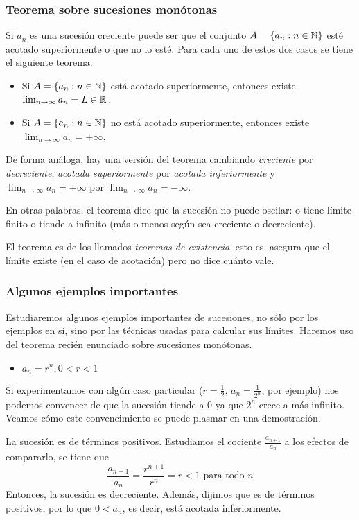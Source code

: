 \documentclass[../teoria.root.tex]{subfiles}
\begin{document}
\subsubsection{Teorema sobre sucesiones monótonas}
Si \(a_n\) es una sucesión creciente puede ser que el conjunto \(A=\{a_n:n\in\mathbb{N}\}\) esté acotado superiormente o que no lo esté.
Para cada uno de estos dos casos se tiene el siguiente teorema.
\begin{itemize}
	\item Si \(A=\{a_n:n\in\mathbb{N}\}\) está acotado superiormente, entonces existe \(\lim_{n\to\infty}a_n=L\in\mathbb{R}\).
	\item Si \(A=\{a_n:n\in\mathbb{N}\}\) no está acotado superiormente, entonces existe \(\lim_{n\to\infty}a_n=+\infty\).
\end{itemize}
De forma análoga, hay una versión del teorema cambiando \textit{creciente} por \textit{decreciente}, \textit{acotada superiormente} por \textit{acotada inferiormente} y \(\lim_{n\to\infty}a_n=+\infty\) por \(\lim_{n\to\infty}a_n=-\infty\).

En otras palabras, el teorema dice que la sucesión no puede oscilar:
o tiene límite finito o tiende a infinito (más o menos según sea creciente o decreciente).

El teorema es de los llamados \textit{teoremas de existencia}, esto es, asegura que el límite existe (en el caso de acotación) pero no dice cuánto vale.

\subsubsection{Algunos ejemplos importantes}
Estudiaremos algunos ejemplos importantes de sucesiones, no sólo por los ejemplos en sí, sino por las técnicas usadas para calcular sus límites.
Haremos uso del teorema recién enunciado sobre sucesiones monótonas.
\begin{itemize}
	\item \(a_n=r^n, 0<r<1\)
\end{itemize}
Si experimentamos con algún caso particular (\(r=\frac{1}{2},\,a_n=\frac{1}{2^n}\), por ejemplo) nos podemos convencer de que la sucesión tiende a 0 ya que \(2^n\) crece a más infinito.
Veamos cómo este convencimiento se puede plasmar en una demostración.

La sucesión es de términos positivos.
Estudiamos el cociente \(\frac{a_{n+1}}{a_n}\) a los efectos de compararlo, se tiene que
\[\frac{a_{n+1}}{a_n}=\frac{r^{n+1}}{r^n}=r<1\text{ para todo }n\]
Entonces, la sucesión es decreciente.
Además, dijimos que es de términos positivos, por lo que \(0<a_n\), es decir, está acotada inferiormente.
\end{document}
